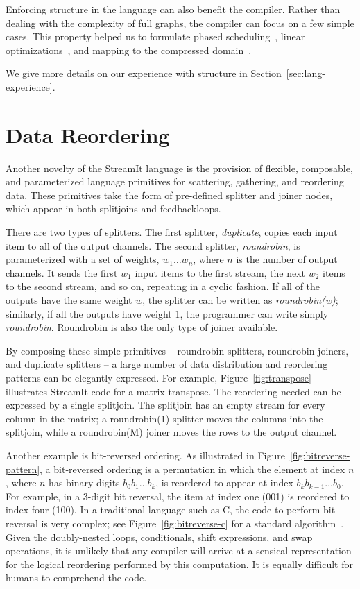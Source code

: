 Enforcing structure in the language can also benefit the compiler.
Rather than dealing with the complexity of full graphs, the compiler
can focus on a few simple cases.  This property helped us to formulate
phased scheduling~\cite{karczmarek-lctes03,karczma-thesis}, linear
optimizations~\cite{lamb-pldi03,lamb-thesis,agrawal-cases05,agrawal-thesis},
and mapping to the compressed domain~\cite{techreport}.

We give more details on our experience with structure in Section~\ref{sec:lang-experience}.

\section{Data Reordering}

Another novelty of the StreamIt language is the provision of flexible,
composable, and parameterized language primitives for scattering,
gathering, and reordering data.  These primitives take the form of
pre-defined splitter and joiner nodes, which appear in both splitjoins
and feedbackloops.

There are two types of splitters.  The first splitter, {\it
  duplicate}, copies each input item to all of the output channels.
The second splitter, {\it roundrobin}, is parameterized with a set of
weights, $w_1 \dots w_n$, where $n$ is the number of output channels.
It sends the first $w_1$ input items to the first stream, the next
$w_2$ items to the second stream, and so on, repeating in a cyclic
fashion.  If all of the outputs have the same weight $w$, the splitter
can be written as {\it roundrobin(w)}; similarly, if all the outputs
have weight 1, the programmer can write simply {\it roundrobin}.
Roundrobin is also the only type of joiner available.

By composing these simple primitives -- roundrobin splitters,
roundrobin joiners, and duplicate splitters -- a large number of data
distribution and reordering patterns can be elegantly expressed.  For
example, Figure~\ref{fig:transpose} illustrates StreamIt code for a
matrix transpose.  The reordering needed can be expressed by a single
splitjoin.  The splitjoin has an empty stream for every column in the
matrix; a roundrobin(1) splitter moves the columns into the splitjoin,
while a roundrobin(M) joiner moves the rows to the output channel.

Another example is bit-reversed ordering.  As illustrated in
Figure~\ref{fig:bitreverse-pattern}, a bit-reversed ordering is a
permutation in which the element at index $n$, where $n$ has binary
digits $b_0b_1 \dots b_k$, is reordered to appear at index $b_kb_{k-1}
\dots b_0$.  For example, in a 3-digit bit reversal, the item at index
one (001) is reordered to index four (100).  In a traditional language
such as C, the code to perform bit-reversal is very complex; see
Figure~\ref{fig:bitreverse-c} for a standard
algorithm~\cite{press_numerical_1992}.  Given the doubly-nested loops,
conditionals, shift expressions, and swap operations, it is unlikely
that any compiler will arrive at a sensical representation for the
logical reordering performed by this computation.  It is equally
difficult for humans to comprehend the code.

